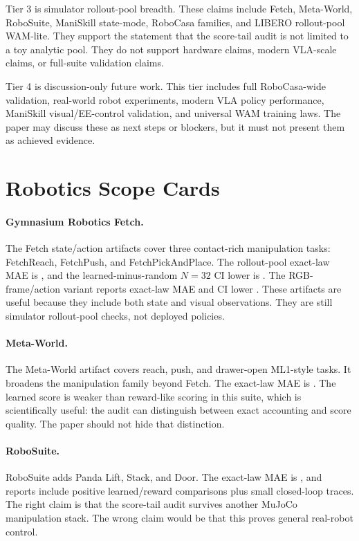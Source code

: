Tier 3 is simulator rollout-pool breadth. These claims include Fetch,
Meta-World, RoboSuite, ManiSkill state-mode, RoboCasa families, and LIBERO
rollout-pool WAM-lite. They support the statement that the score-tail audit is
not limited to a toy analytic pool. They do not support hardware claims,
modern VLA-scale claims, or full-suite validation claims.

Tier 4 is discussion-only future work. This tier includes full RoboCasa-wide
validation, real-world robot experiments, modern VLA policy performance,
ManiSkill visual/EE-control validation, and universal WAM training laws. The
paper may discuss these as next steps or blockers, but it must not present them
as achieved evidence.

\section{Robotics Scope Cards}
\label{app:scope-cards}

\paragraph{Gymnasium Robotics Fetch.}
The Fetch state/action artifacts cover three contact-rich manipulation tasks:
FetchReach, FetchPush, and FetchPickAndPlace. The rollout-pool exact-law MAE is
\VFourWAMFetchExactMAE{}, and the learned-minus-random $N=32$ CI lower is
\VFourWAMFetchCILo{}. The RGB-frame/action variant reports exact-law MAE
\VFourWAMFetchRGBExactMAE{} and CI lower \VFourWAMFetchRGBCILo{}. These
artifacts are useful because they include both state and visual observations.
They are still simulator rollout-pool checks, not deployed policies.

\paragraph{Meta-World.}
The Meta-World artifact covers reach, push, and drawer-open ML1-style tasks.
It broadens the manipulation family beyond Fetch. The exact-law MAE is
\VFourWAMMetaWorldExactMAE{}. The learned score is weaker than reward-like
scoring in this suite, which is scientifically useful: the audit can distinguish
between exact accounting and score quality. The paper should not hide that
distinction.

\paragraph{RoboSuite.}
RoboSuite adds Panda Lift, Stack, and Door. The exact-law MAE is
\VFourWAMRoboSuiteExactMAE{}, and reports include positive learned/reward
comparisons plus small closed-loop traces. The right claim is that the
score-tail audit survives another MuJoCo manipulation stack. The wrong claim
would be that this proves general real-robot control.


